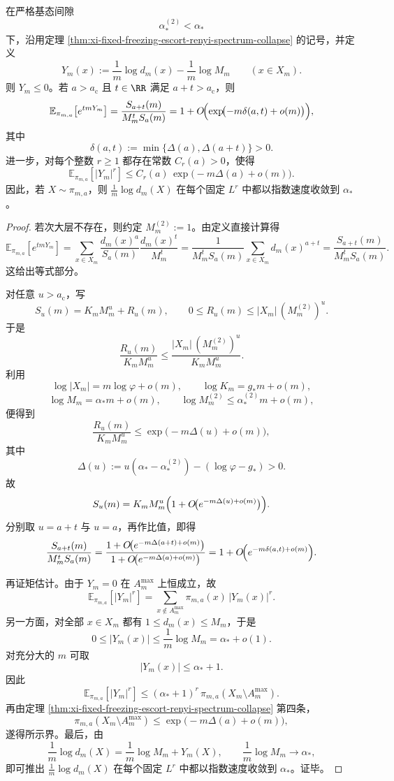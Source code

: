 \begin{theorem}[冻结相中对数多重度涨落的矩母函数刚性]\label{thm:xi-time-part9u-frozen-escort-logmultiplicity-mgf}
在严格基态间隙
\[
\alpha_*^{(2)}<\alpha_*
\]
下，沿用定理 \ref{thm:xi-fixed-freezing-escort-renyi-spectrum-collapse} 的记号，并定义
\[
Y_m(x):=\frac1m\log d_m(x)-\frac1m\log M_m
\qquad (x\in X_m).
\]
则 \(Y_m\le 0\)。若 \(a>a_{\mathrm c}\) 且 \(t\in\RR\) 满足 \(a+t>a_{\mathrm c}\)，则
\[
\mathbb E_{\pi_{m,a}}\!\left[e^{tmY_m}\right]
=
\frac{S_{a+t}(m)}{M_m^tS_a(m)}
=
1+O\!\Bigl(
\exp\!\bigl(-m\delta(a,t)+o(m)\bigr)
\Bigr),
\]
其中
\[
\delta(a,t):=\min\{\Delta(a),\Delta(a+t)\}>0.
\]
进一步，对每个整数 \(r\ge 1\) 都存在常数 \(C_r(a)>0\)，使得
\[
\mathbb E_{\pi_{m,a}}\!\left[|Y_m|^r\right]
\le
C_r(a)\,
\exp\!\bigl(-m\Delta(a)+o(m)\bigr).
\]
因此，若 \(X\sim \pi_{m,a}\)，则 \(\frac1m\log d_m(X)\) 在每个固定 \(L^r\) 中都以指数速度收敛到 \(\alpha_*\)。
\end{theorem}
\begin{proof}
若次大层不存在，则约定 \(M_m^{(2)}:=1\)。由定义直接计算得
\[
\mathbb E_{\pi_{m,a}}\!\left[e^{tmY_m}\right]
=
\sum_{x\in X_m}\frac{d_m(x)^a}{S_a(m)}
\frac{d_m(x)^t}{M_m^t}
=
\frac{1}{M_m^tS_a(m)}\sum_{x\in X_m}d_m(x)^{a+t}
=
\frac{S_{a+t}(m)}{M_m^tS_a(m)}.
\]
这给出等式部分。

对任意 \(u>a_{\mathrm c}\)，写
\[
S_u(m)=K_mM_m^u+R_u(m),
\qquad
0\le R_u(m)\le |X_m|\,(M_m^{(2)})^u.
\]
于是
\[
\frac{R_u(m)}{K_mM_m^u}
\le
\frac{|X_m|\,(M_m^{(2)})^u}{K_mM_m^u}.
\]
利用
\[
\log|X_m|=m\log\varphi+o(m),
\qquad
\log K_m=g_*m+o(m),
\]
\[
\log M_m=\alpha_*m+o(m),
\qquad
\log M_m^{(2)}\le \alpha_*^{(2)}m+o(m),
\]
便得到
\[
\frac{R_u(m)}{K_mM_m^u}
\le
\exp\!\bigl(-m\Delta(u)+o(m)\bigr),
\]
其中
\[
\Delta(u):=u(\alpha_*-\alpha_*^{(2)})-(\log\varphi-g_*)>0.
\]
故
\[
S_u(m)=K_mM_m^u
\Bigl(
1+O\!\bigl(e^{-m\Delta(u)+o(m)}\bigr)
\Bigr).
\]
分别取 \(u=a+t\) 与 \(u=a\)，再作比值，即得
\[
\frac{S_{a+t}(m)}{M_m^tS_a(m)}
=
\frac{
1+O\!\bigl(e^{-m\Delta(a+t)+o(m)}\bigr)
}{
1+O\!\bigl(e^{-m\Delta(a)+o(m)}\bigr)
}
=
1+O\!\Bigl(
e^{-m\delta(a,t)+o(m)}
\Bigr).
\]

再证矩估计。由于 \(Y_m=0\) 在 \(A_m^{\max}\) 上恒成立，故
\[
\mathbb E_{\pi_{m,a}}\!\left[|Y_m|^r\right]
=
\sum_{x\notin A_m^{\max}}\pi_{m,a}(x)\,|Y_m(x)|^r.
\]
另一方面，对全部 \(x\in X_m\) 都有 \(1\le d_m(x)\le M_m\)，于是
\[
0\le |Y_m(x)|
\le
\frac1m\log M_m
=
\alpha_*+o(1).
\]
对充分大的 \(m\) 可取
\[
|Y_m(x)|\le \alpha_*+1.
\]
因此
\[
\mathbb E_{\pi_{m,a}}\!\left[|Y_m|^r\right]
\le
(\alpha_*+1)^r\,\pi_{m,a}(X_m\setminus A_m^{\max}).
\]
再由定理 \ref{thm:xi-fixed-freezing-escort-renyi-spectrum-collapse} 第四条，
\[
\pi_{m,a}(X_m\setminus A_m^{\max})
\le
\exp\!\bigl(-m\Delta(a)+o(m)\bigr),
\]
遂得所示界。最后，由
\[
\frac1m\log d_m(X)=\frac1m\log M_m+Y_m(X),
\qquad
\frac1m\log M_m\to \alpha_*,
\]
即可推出 \(\frac1m\log d_m(X)\) 在每个固定 \(L^r\) 中都以指数速度收敛到 \(\alpha_*\)。证毕。
\end{proof}

